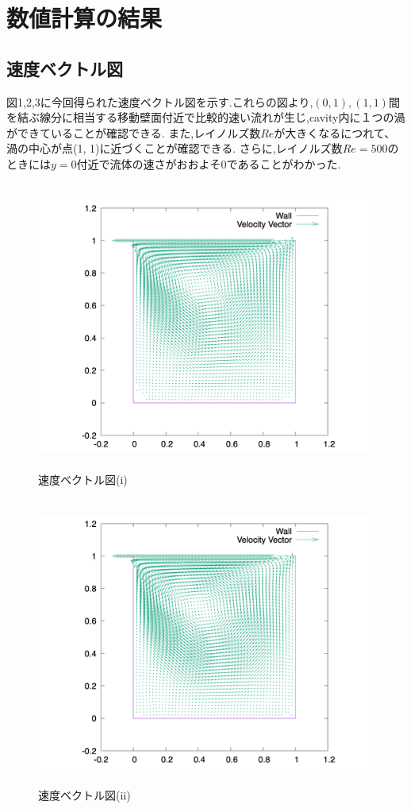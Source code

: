 \documentclass[upLaTeX,a4paper]{jsarticle}
\begin{document}
\section{数値計算の結果}
\subsection{速度ベクトル図}
図1,2,3に今回得られた速度ベクトル図を示す.これらの図より,$(0,1),(1,1)$間を結ぶ線分に相当する移動壁面付近で比較的速い流れが生じ,cavity内に１つの渦ができていることが確認できる.
また,レイノルズ数$Re$が大きくなるにつれて、渦の中心が点(1, 1)に近づくことが確認できる.
さらに,レイノルズ数$Re=500$のときには$y=0$付近で流体の速さがおおよそ0であることがわかった.
\begin{figure}[H]
  \centering
  \includegraphics[height=9.5cm]{outputs/img/velocity_vector_re50.png}
  \caption{速度ベクトル図(i)}
  \label{fig:velocity_vector_re50}
\end{figure}
\begin{figure}[H]
  \centering
  \includegraphics[height=9.5cm]{outputs/img/velocity_vector_re200.png}
  \caption{速度ベクトル図(ii)}
  \label{fig:velocity_vector_re200}
\end{figure}
\end{document}
